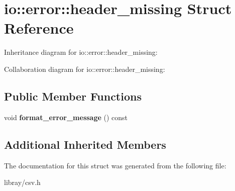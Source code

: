 \hypertarget{structio_1_1error_1_1header__missing}{}\section{io\+:\+:error\+:\+:header\+\_\+missing Struct Reference}
\label{structio_1_1error_1_1header__missing}


Inheritance diagram for io\+:\+:error\+:\+:header\+\_\+missing\+:


Collaboration diagram for io\+:\+:error\+:\+:header\+\_\+missing\+:
\subsection*{Public Member Functions}
\begin{DoxyCompactItemize}
\item 
\mbox{\label{structio_1_1error_1_1header__missing_ae130d632556617cf136cc4392b517b30}} 
void {\bfseries format\+\_\+error\+\_\+message} () const
\end{DoxyCompactItemize}
\subsection*{Additional Inherited Members}


The documentation for this struct was generated from the following file\+:\begin{DoxyCompactItemize}
\item 
libray/csv.\+h\end{DoxyCompactItemize}
